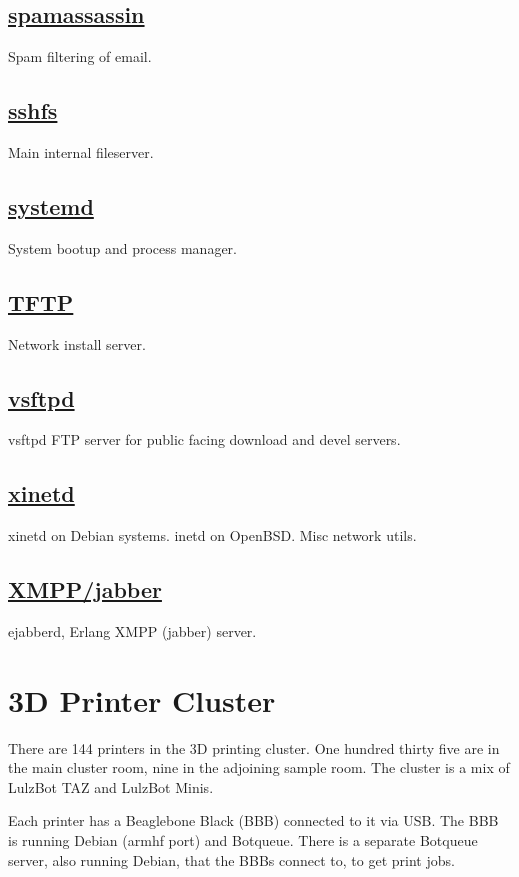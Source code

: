 \subsection{\href{http://www.spamassassin.org/}{spamassassin}}
Spam filtering of email.

\subsection{\href{http://fuse.sourceforge.net/sshfs.html}{sshfs}}
Main internal fileserver.

\subsection{\href{http://www.freedesktop.org/wiki/Software/systemd}{systemd}}
System bootup and process manager.

\subsection{\href{http://dnsmasq.org/}{TFTP}}
Network install server.

\subsection{\href{http://vsftpd.beasts.org/}{vsftpd}}
vsftpd FTP server for public facing download and devel servers.

\subsection{\href{http://www.xinetd.org}{xinetd}}
xinetd on Debian systems. inetd on OpenBSD. Misc network utils.

\subsection{\href{http://www.ejabberd.im/}{XMPP/jabber}}
ejabberd, Erlang XMPP (jabber) server.


\section{3D Printer Cluster}
There are 144 printers in the 3D printing cluster. One hundred thirty five are
in the main cluster room, nine in the adjoining sample room. The cluster is a
mix of LulzBot TAZ and LulzBot Minis.

Each printer has a Beaglebone Black (BBB) connected to it via USB. The
BBB is running Debian (armhf port) and Botqueue. There is a separate Botqueue
server, also running Debian, that the BBBs connect to, to get print jobs.


